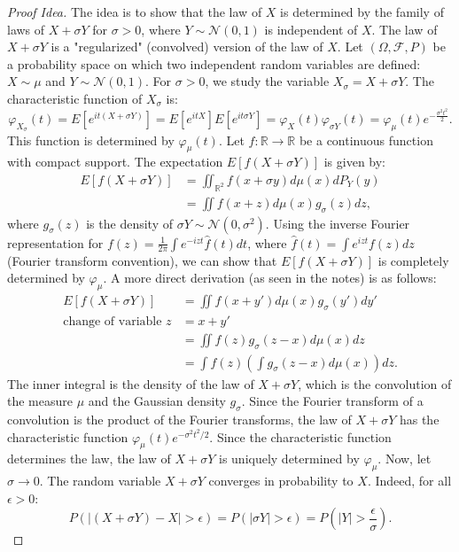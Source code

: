 \begin{proof}[Proof Idea]
The idea is to show that the law of $X$ is determined by the family of laws of $X+\sigma Y$ for $\sigma > 0$, where $Y \sim \mathcal{N}(0,1)$ is independent of $X$. The law of $X+\sigma Y$ is a "regularized" (convolved) version of the law of $X$.
Let $(\Omega, \mathcal{F}, P)$ be a probability space on which two independent random variables are defined: $X \sim \mu$ and $Y \sim \mathcal{N}(0,1)$. For $\sigma > 0$, we study the variable $X_\sigma = X+\sigma Y$.
The characteristic function of $X_\sigma$ is:
\[ \varphi_{X_\sigma}(t) = E[e^{it(X+\sigma Y)}] = E[e^{itX}]E[e^{it\sigma Y}] = \varphi_X(t) \varphi_{\sigma Y}(t) = \varphi_\mu(t) e^{-\frac{\sigma^2 t^2}{2}}. \]
This function is determined by $\varphi_\mu(t)$.
Let $f: \mathbb{R} \to \mathbb{R}$ be a continuous function with compact support. The expectation $E[f(X+\sigma Y)]$ is given by:
\begin{align*}
E[f(X+\sigma Y)] &= \iint_{\mathbb{R}^2} f(x+\sigma y) d\mu(x) dP_Y(y) \\
&= \iint f(x+z) d\mu(x) g_\sigma(z) dz,
\end{align*}
where $g_\sigma(z)$ is the density of $\sigma Y \sim \mathcal{N}(0,\sigma^2)$.
Using the inverse Fourier representation for $f(z) = \frac{1}{2\pi} \int e^{-izt} \hat{f}(t) dt$, where $\hat{f}(t) = \int e^{izt}f(z)dz$ (Fourier transform convention), we can show that $E[f(X+\sigma Y)]$ is completely determined by $\varphi_\mu$. A more direct derivation (as seen in the notes) is as follows:
\begin{align*}
E[f(X+\sigma Y)] &= \iint f(x+y') d\mu(x) g_\sigma(y') dy' \\
\text{change of variable } z &= x+y' \\
&= \iint f(z) g_\sigma(z-x) d\mu(x) dz \\
&= \int f(z) \left( \int g_\sigma(z-x) d\mu(x) \right) dz.
\end{align*}
The inner integral is the density of the law of $X+\sigma Y$, which is the convolution of the measure $\mu$ and the Gaussian density $g_\sigma$. Since the Fourier transform of a convolution is the product of the Fourier transforms, the law of $X+\sigma Y$ has the characteristic function $\varphi_\mu(t) e^{-\sigma^2 t^2/2}$.
Since the characteristic function determines the law, the law of $X+\sigma Y$ is uniquely determined by $\varphi_\mu$.
Now, let $\sigma \to 0$. The random variable $X+\sigma Y$ converges in probability to $X$.
Indeed, for all $\epsilon > 0$:
\[ P(|(X+\sigma Y) - X| > \epsilon) = P(|\sigma Y| > \epsilon) = P\left(|Y| > \frac{\epsilon}{\sigma}\right). \]

\end{proof}
